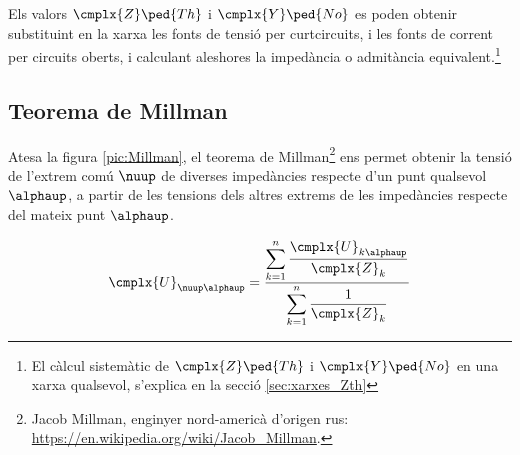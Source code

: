 Els valors $\cmplx{Z}\ped{Th}$ i  $\cmplx{Y}\ped{No}$ es poden
obtenir substituint en la xarxa  les fonts de tensió  per curtcircuits, i les fonts de corrent per circuits oberts, i calculant
aleshores la impedància o admitància equivalent.\footnote{El càlcul sistemàtic de $\cmplx{Z}\ped{Th}$ i  $\cmplx{Y}\ped{No}$ en una xarxa qualsevol, s'explica en la secció \ref{sec:xarxes_Zth}}

\subsection{Teorema de Millman}\label{sec:millman}

Atesa la figura \vref{pic:Millman}, el teorema
de Millman\footnote{Jacob Millman, enginyer nord-americà d'origen rus: \href{https://en.wikipedia.org/wiki/Jacob_Millman}{https:/\!\!/en.wikipedia.org/wiki/Jacob\_Millman}.} ens permet
obtenir la tensió de l'extrem comú $\nuup$ de diverses impedàncies respecte d'un punt
qualsevol $\alphaup$, a partir de les tensions dels altres extrems de les impedàncies respecte  del mateix punt $\alphaup$.

\hfill
\begin{minipage}[b]{7cm}
    
    \label{pic:Millman}
\end{minipage}
\hfill
\begin{minipage}[b][4.5cm][t]{6cm}
    \begin{equation}
        \cmplx{U}_{\nuup\alphaup} = \frac{\displaystyle\sum_{k=1}^n \dfrac{\cmplx{U}_{k\alphaup}}{\cmplx{Z}_k}} {\displaystyle\sum_{k=1}^n \dfrac{1}{\cmplx{Z}_k}}
        \label{eq:millman}
    \end{equation}
\end{minipage}

\vspace{5mm}

